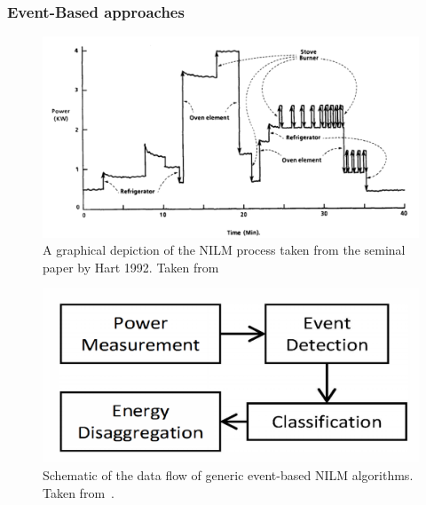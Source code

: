 \documentclass[11pt]{cmuthesis} %
\begin{document}
\subsubsection{Event-Based approaches}
\begin{figure}
\centering
\includegraphics[width=0.8\linewidth]{nilm_hart.png}
\caption[A graphical depiction of the NILM process.]{A graphical depiction of the NILM process taken from the seminal paper by Hart 1992. Taken from~\cite{hart1992nonintrusive}}
\label{fig:hart}
\end{figure}

\begin{figure}
    \centering
    \includegraphics[width=0.65\linewidth]{nilm_event.png}
    \caption[Schematic of the data flow of generic event-based NILM algorithms.]{Schematic of the data flow of generic event-based NILM algorithms. Taken from~\cite{anderson2012event}.}
    \label{fig:hart2}
\end{figure}
\end{document}
